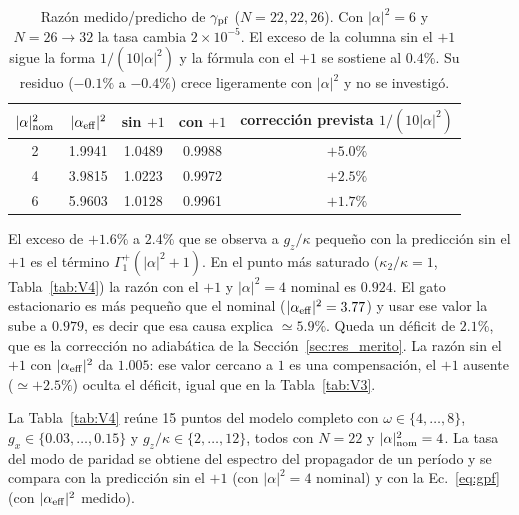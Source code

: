 \documentclass[11pt,a4paper]{article}
\theoremstyle{definition}
\begin{document}
\begin{table}[h]
\centering
\begin{tabular}{ccccc}
\toprule
$|\alpha|^2_{\rm nom}$ & $|\alpha_{\rm eff}|^2$ & sin $+1$ & con $+1$ & corrección prevista $1/(10|\alpha|^2)$\\
\midrule
2 & 1.9941 & 1.0489 & 0.9988 & $+5.0\%$\\
4 & 3.9815 & 1.0223 & 0.9972 & $+2.5\%$\\
6 & 5.9603 & 1.0128 & 0.9961 & $+1.7\%$\\
\bottomrule
\end{tabular}
\caption{Razón medido/predicho de $\gamma_{\rm pf}$ ($N=22,22,26$). Con $|\alpha|^2=6$ y $N=26\to32$ la tasa cambia $2\times10^{-5}$. El exceso de la columna sin el $+1$ sigue la forma $1/(10|\alpha|^2)$ y la fórmula con el $+1$ se sostiene al $0.4\%$. Su residuo ($-0.1\%$ a $-0.4\%$) crece ligeramente con $|\alpha|^2$ y no se investigó.}
\label{tab:V4b}
\end{table}

El exceso de $+1.6\%$ a $2.4\%$ que se observa a $g_z/\kappa$ pequeño con la predicción sin el $+1$ es el término $\Gamma_1^{+}(|\alpha|^2+1)$. En el punto más saturado ($\kappa_2/\kappa=1$, Tabla~\ref{tab:V4}) la razón con el $+1$ y $|\alpha|^2=4$ nominal es $0.924$. El gato estacionario es más pequeño que el nominal ($|\alpha_{\rm eff}|^2=3.77$) y usar ese valor la sube a $0.979$, es decir que esa causa explica $\simeq5.9\%$. Queda un déficit de $2.1\%$, que es la corrección no adiabática de la Sección~\ref{sec:res_merito}. La razón sin el $+1$ con $|\alpha_{\rm eff}|^2$ da $1.005$: ese valor cercano a $1$ es una compensación, el $+1$ ausente ($\simeq+2.5\%$) oculta el déficit, igual que en la Tabla~\ref{tab:V3}.

\label{sec:res_merito}

La Tabla~\ref{tab:V4} reúne 15 puntos del modelo completo con $\omega\in\{4,\dots,8\}$, $g_x\in\{0.03,\dots,0.15\}$ y $g_z/\kappa\in\{2,\dots,12\}$, todos con $N=22$ y $|\alpha|^2_{\rm nom}=4$. La tasa del modo de paridad se obtiene del espectro del propagador de un período y se compara con la predicción sin el $+1$ (con $|\alpha|^2=4$ nominal) y con la Ec.~\eqref{eq:gpf} (con $|\alpha_{\rm eff}|^2$ medido).
\end{document}
